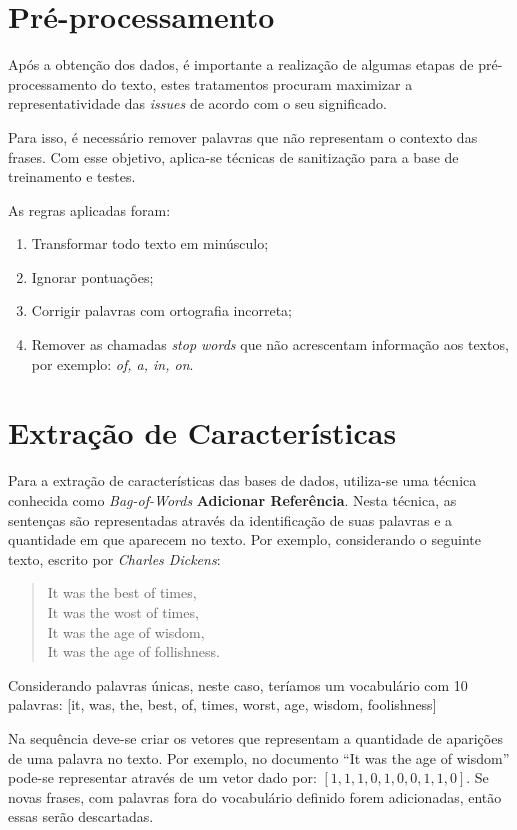 \documentclass[conference]{IEEEtran}
\begin{document}
\section{Pré-processamento}

Após a obtenção dos dados, é importante a realização de algumas etapas de pré-processamento do texto, estes tratamentos procuram maximizar a representatividade das \textit{issues} de acordo com o seu significado.

Para isso, é necessário remover palavras que não representam o contexto das frases. Com esse objetivo, aplica-se técnicas de sanitização para a base de treinamento e testes.

As regras aplicadas foram:

\begin{enumerate}
    \item Transformar todo texto em minúsculo;
    \item Ignorar pontuações;
    \item Corrigir palavras com ortografia incorreta;
    \item Remover as chamadas \textit{stop words} que não acrescentam informação aos textos, por exemplo: \textit{of, a, in, on}.
\end{enumerate}

\section{Extração de Características}

Para a extração de características das bases de dados, utiliza-se uma técnica conhecida como \textit{Bag-of-Words} \textbf{Adicionar Referência}. Nesta técnica, as sentenças são representadas através da identificação de suas palavras e a quantidade em que aparecem no texto. Por exemplo, considerando o seguinte texto, escrito por \textit{Charles Dickens}:

\begin{quote}
    It was the best of times,\\
    It was the wost of times,\\
    It was the age of wisdom,\\
    It was the age of follishness.
\end{quote}

Considerando palavras únicas, neste caso, teríamos um vocabulário com 10 palavras: [it, was, the, best, of, times, worst, age, wisdom, foolishness]

Na sequência deve-se criar os vetores que representam a quantidade de aparições de uma palavra no texto. Por exemplo, no documento ``It was the age of wisdom'' pode-se representar através de um vetor dado por: $[1, 1, 1, 0, 1, 0, 0, 1, 1, 0]$. Se novas frases, com palavras fora do vocabulário definido forem adicionadas, então essas serão descartadas.
\end{document}
